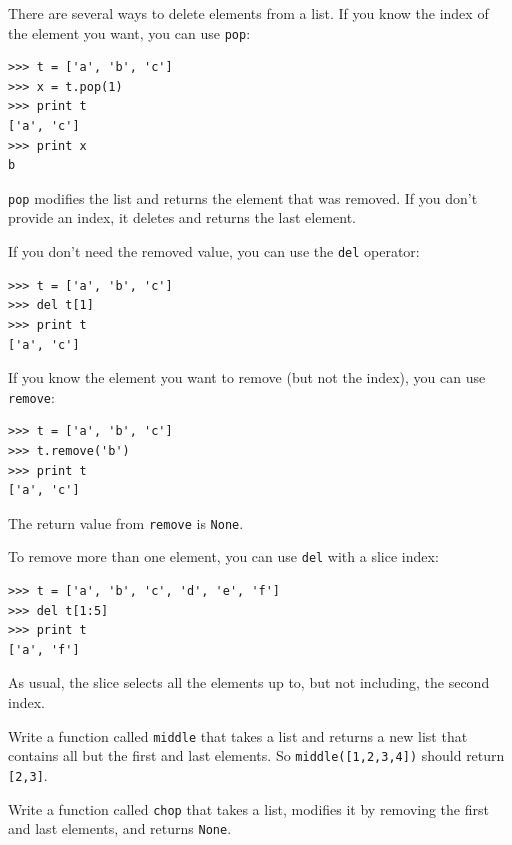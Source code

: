 \documentclass[10pt]{book}
\begin{document}
There are several ways to delete elements from a list.  If you
know the index of the element you want, you can use
{\tt pop}:

\begin{verbatim}
>>> t = ['a', 'b', 'c']
>>> x = t.pop(1)
>>> print t
['a', 'c']
>>> print x
b
\end{verbatim}
%
{\tt pop} modifies the list and returns the element that was removed.
If you don't provide an index, it deletes and returns the
last element.

If you don't need the removed value, you can use the {\tt del}
operator:

\begin{verbatim}
>>> t = ['a', 'b', 'c']
>>> del t[1]
>>> print t
['a', 'c']
\end{verbatim}
%

If you know the element you want to remove (but not the index), you
can use {\tt remove}:

\begin{verbatim}
>>> t = ['a', 'b', 'c']
>>> t.remove('b')
>>> print t
['a', 'c']
\end{verbatim}
%
The return value from {\tt remove} is {\tt None}.

To remove more than one element, you can use {\tt del} with
a slice index:

\begin{verbatim}
>>> t = ['a', 'b', 'c', 'd', 'e', 'f']
>>> del t[1:5]
>>> print t
['a', 'f']
\end{verbatim}
%
As usual, the slice selects all the elements up to, but not
including, the second index.

\begin{exercise}

Write a function called \verb"middle" that takes a list and
returns a new list that contains all but the first and last
elements.  So \verb"middle([1,2,3,4])" should return \verb"[2,3]".

\end{exercise}

\begin{exercise}

Write a function called \verb"chop" that takes a list, modifies it
by removing the first and last elements, and returns {\tt None}.

\end{exercise}
\end{document}
